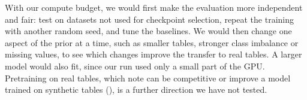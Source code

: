 With our compute budget, we would first make the evaluation more
independent and fair: test on datasets not used for checkpoint selection,
repeat the training with another random seed, and tune the baselines. We would then change one aspect of
the prior at a time, such as smaller tables, stronger class imbalance or
missing values, to see which changes improve the transfer to real tables. A
larger model would also fit, since our run used only a small part of the
GPU. Pretraining on real tables, which \citet{qu2026tabiclv2} note can be
competitive or improve a model trained on synthetic tables
(), is a further direction we have not tested.
